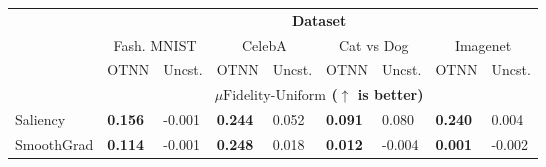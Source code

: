 \begin{table}[]
\begin{tabular}{lllllllll}
\cline{2-9}
\multicolumn{1}{c}{}                                     & \multicolumn{8}{c}{\cellcolor[HTML]{EFEFEF}\textbf{Dataset}}                                                                                                                                                                                   \\ \cline{2-9} 
\multicolumn{1}{c}{}                                     & \multicolumn{2}{c|}{Fash. MNIST}                                 & \multicolumn{2}{c|}{CelebA}                              & \multicolumn{2}{c|}{Cat vs Dog}                         & \multicolumn{2}{c}{Imagenet}                           \\
\multicolumn{1}{c}{\multirow{-3}{*}{}}                   & \multicolumn{1}{c|}{OTNN} & \multicolumn{1}{c|}{Uncst.}          & \multicolumn{1}{c|}{OTNN} & \multicolumn{1}{c|}{Uncst.}  & \multicolumn{1}{c|}{OTNN} & \multicolumn{1}{c|}{Uncst.} & \multicolumn{1}{c|}{OTNN} & \multicolumn{1}{c}{Uncst.} \\ \hline
\rowcolor[HTML]{EFEFEF} 
\multicolumn{1}{l|}{\cellcolor[HTML]{EFEFEF}Attribution} & \multicolumn{8}{c}{\cellcolor[HTML]{EFEFEF}\textbf{$\mu\text{Fidelity-Uniform}$ ($\uparrow$ is better)}}                                                                                                                                       \\ \hline
\multicolumn{1}{l|}{Saliency}                            & \textbf{0.156}            & \multicolumn{1}{l|}{-0.001}          & \textbf{0.244}            & \multicolumn{1}{l|}{0.052}   &                   \textbf{0.091}        & \multicolumn{1}{l|}{0.080}       &           \textbf{0.240 }          &  0.004                            \\
\multicolumn{1}{l|}{SmoothGrad}                          & \textbf{0.114}            & \multicolumn{1}{l|}{-0.001}          & \textbf{0.248}            & \multicolumn{1}{l|}{0.018}   &                  \textbf{0.012}         & \multicolumn{1}{l|}{-0.004}       &   \textbf{0.001}                         & -0.002                      \\

\end{tabular}
\end{table}
